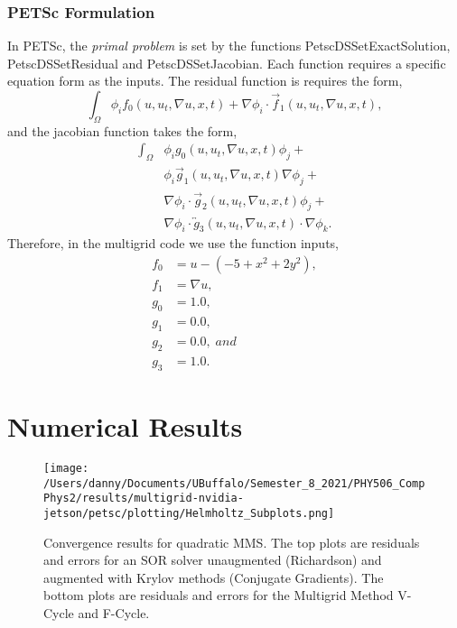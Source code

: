 \documentclass[]{article}
\theoremstyle{definition}
\begin{document}
\subsubsection{PETSc Formulation}

In PETSc, the \textit{primal problem} is set by the functions PetscDSSetExactSolution, PetscDSSetResidual and PetscDSSetJacobian.  Each function requires a specific equation form as the inputs.  The residual function is requires the form,
\begin{equation}
\int_\Omega \phi_i f_0(u, u_t, \nabla u, x, t) + \nabla\phi_i \cdot {\vec f}_1(u, u_t, \nabla u, x, t),
\end{equation}
and the jacobian function takes the form,
\begin{equation}
\begin{split}
\int_\Omega &\phi_i g_0(u, u_t, \nabla u, x, t) \phi_j + \\
&\phi_i {\vec g}_1(u, u_t, \nabla u, x, t) \nabla \phi_j + \\
&\nabla\phi_i \cdot {\vec g}_2(u, u_t, \nabla u, x, t) \phi_j + \\
&\nabla\phi_i \cdot {\overleftrightarrow g}_3(u, u_t, \nabla u, x, t) \cdot \nabla \phi_k.
\end{split}
\end{equation}
Therefore, in the multigrid code we use the function inputs,
\begin{align}
f_0 &= u - (-5 + x^2 + 2 y^2), \\
f_1 &= \nabla u, \\
g_0 &= 1.0, \\
g_1 &= 0.0, \\
g_2 &= 0.0,\; and \\
g_3 &= 1.0.
\end{align}


\section{Numerical Results}

\begin{figure}[H]
\begin{center}
\texttt{[image: /Users/danny/Documents/UBuffalo/Semester\_8\_2021/PHY506\_CompPhys2/results/multigrid-nvidia-jetson/petsc/plotting/Helmholtz\_Subplots.png]}
\end{center}
\caption{Convergence results for quadratic MMS.  The top plots are residuals and errors for an SOR solver unaugmented (Richardson) and augmented with Krylov methods (Conjugate Gradients).  The bottom plots are residuals and errors for the Multigrid Method V-Cycle and F-Cycle.}
\label{ConvQuad}
\end{figure}
\end{document}
